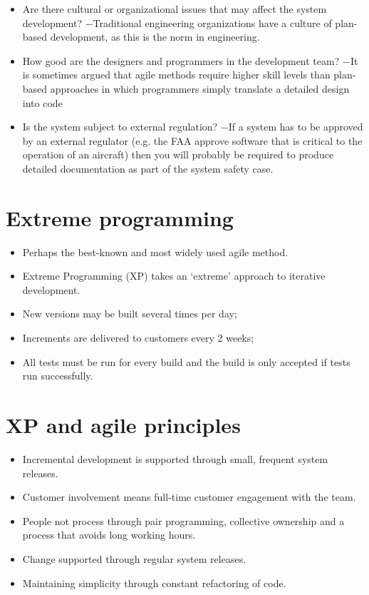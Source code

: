 \begin{itemize}
\item Are there cultural or organizational issues that may affect the system development?
\newline $-$Traditional engineering organizations have a culture of plan-based development, as this is the norm in engineering.
\item How good are the designers and programmers in the development team?
\newline $-$It is sometimes argued that agile methods require higher skill levels than plan-based approaches in which programmers simply translate a detailed design into code
\item Is the system subject to external regulation?
\newline $-$If a system has to be approved by an external regulator (e.g. the FAA approve software that is critical to the operation of an aircraft) then you will probably be required to produce detailed documentation as part of the system safety case.

\end{itemize}
\section{ Extreme programming}
\begin{itemize}

\item Perhaps the best-known and most widely used agile method.

\item Extreme Programming (XP) takes an ‘extreme’ approach to iterative development.

\item New versions may be built several times per day; \item Increments are delivered to customers every 2 weeks;
\item All tests must be run for every build and the build is only accepted if tests run successfully.

\end{itemize}

\section{ XP and agile principles}
\begin{itemize}
\item Incremental development is supported through small, frequent system releases.

\item Customer involvement means full-time customer engagement with the team.

\item People not process through pair programming, collective ownership and a process that avoids long working hours.

\item Change supported through regular system releases.

\item Maintaining simplicity through constant refactoring of code.
\end{itemize}
